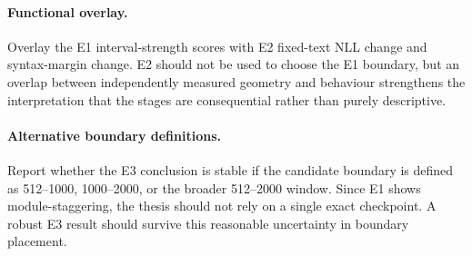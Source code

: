 \paragraph{Functional overlay.}
Overlay the E1 interval-strength scores with E2 fixed-text NLL change and syntax-margin change. E2 should not be used to choose the E1 boundary, but an overlap between independently measured geometry and behaviour strengthens the interpretation that the stages are consequential rather than purely descriptive.

\paragraph{Alternative boundary definitions.}
Report whether the E3 conclusion is stable if the candidate boundary is defined as 512--1000, 1000--2000, or the broader 512--2000 window. Since E1 shows module-staggering, the thesis should not rely on a single exact checkpoint. A robust E3 result should survive this reasonable uncertainty in boundary placement.
